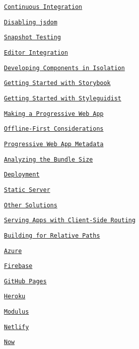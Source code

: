 \begin{DoxyItemize}
\begin{DoxyItemize}
\item \href{#continuous-integration}{\tt Continuous Integration}
\item \href{#disabling-jsdom}{\tt Disabling jsdom}
\item \href{#snapshot-testing}{\tt Snapshot Testing}
\item \href{#editor-integration}{\tt Editor Integration}
\end{DoxyItemize}
\item \href{#developing-components-in-isolation}{\tt Developing Components in Isolation}
\begin{DoxyItemize}
\item \href{#getting-started-with-storybook}{\tt Getting Started with Storybook}
\item \href{#getting-started-with-styleguidist}{\tt Getting Started with Styleguidist}
\end{DoxyItemize}
\item \href{#making-a-progressive-web-app}{\tt Making a Progressive Web App}
\begin{DoxyItemize}
\item \href{#offline-first-considerations}{\tt Offline-\/\+First Considerations}
\item \href{#progressive-web-app-metadata}{\tt Progressive Web App Metadata}
\end{DoxyItemize}
\item \href{#analyzing-the-bundle-size}{\tt Analyzing the Bundle Size}
\item \href{#deployment}{\tt Deployment}
\begin{DoxyItemize}
\item \href{#static-server}{\tt Static Server}
\item \href{#other-solutions}{\tt Other Solutions}
\item \href{#serving-apps-with-client-side-routing}{\tt Serving Apps with Client-\/\+Side Routing}
\item \href{#building-for-relative-paths}{\tt Building for Relative Paths}
\item \href{#azure}{\tt Azure}
\item \href{#firebase}{\tt Firebase}
\item \href{#github-pages}{\tt Git\+Hub Pages}
\item \href{#heroku}{\tt Heroku}
\item \href{#modulus}{\tt Modulus}
\item \href{#netlify}{\tt Netlify}
\item \href{#now}{\tt Now}

\end{DoxyItemize}
\end{DoxyItemize}
